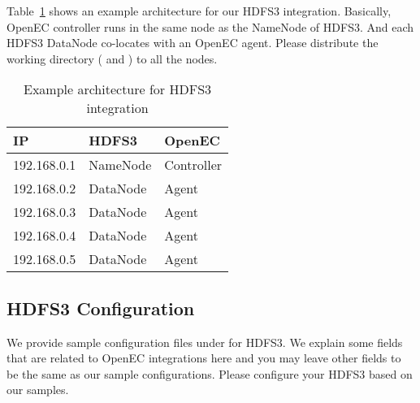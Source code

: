 \documentclass[letterpaper,12pt]{article}
\newcommand{\openec}{{\sf\small OpenEC}\xspace}
\begin{document}
Table~\ref{tab:hdfs3arch} shows an example architecture for our HDFS3 integration.
Basically, \openec controller runs in the same node as the NameNode of HDFS3.
And each HDFS3 DataNode co-locates with an \openec agent. Please distribute
the working directory ( and ) to all 
the nodes.

\begin{table}[h]
\centering
\footnotesize
\renewcommand{\arraystretch}{1.1}
\begin{tabular}{|l|l|l|}
\hline
IP & HDFS3 & OpenEC \\
\hline
\hline
192.168.0.1 & NameNode & Controller \\
\hline
192.168.0.2 & DataNode & Agent \\
\hline
192.168.0.3 & DataNode & Agent \\
\hline
192.168.0.4 & DataNode & Agent \\
\hline
192.168.0.5 & DataNode & Agent \\
\hline
\end{tabular}
\vspace{-3pt}
\caption{Example architecture for HDFS3 integration}
\label{tab:hdfs3arch}
\end{table}

\subsection{HDFS3 Configuration}

We provide sample configuration files under  for HDFS3.
We explain some fields that are related to \openec integrations here and you may leave other fields
to be the same as our sample configurations. Please configure your HDFS3 based on our samples.
\end{document}
